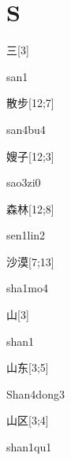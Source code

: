 ﻿%
\section*{S}

\begin{verbete}[san1]{三}[3]
\begin{pronuncia}{san1}
\end{pronuncia}
\end{verbete}

\begin{verbete}[san4bu4]{散步}[12;7]
\begin{pronuncia}{san4bu4}
\end{pronuncia}
\end{verbete}

\begin{verbete}[sao3zi0]{嫂子}[12;3]
\begin{pronuncia}{sao3zi0}
\end{pronuncia}
\end{verbete}

\begin{verbete}{森林}[12;8]
\begin{pronuncia}{sen1lin2}
\end{pronuncia}
\end{verbete}

\begin{verbete}[sha1mo4]{沙漠}[7;13]
\begin{pronuncia}{sha1mo4}
\end{pronuncia}
\end{verbete}

\begin{verbete}[shan1]{山}[3]
\begin{pronuncia}{shan1}
\end{pronuncia}
\end{verbete}

\begin{verbete}{山东}[3;5]
\begin{pronuncia}{Shan4dong3}
\end{pronuncia}
\end{verbete}

\begin{verbete}[shan1qu1]{山区}[3;4]
\begin{pronuncia}{shan1qu1}
\end{pronuncia}
\end{verbete}

